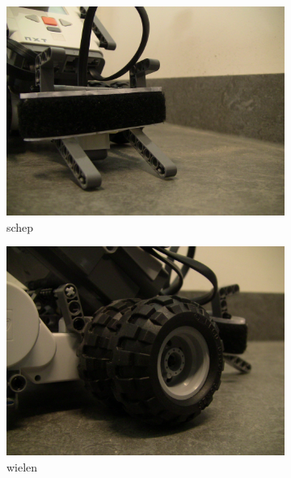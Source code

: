 \documentclass[tt2]{penoverslag}
\begin{document}
\begin{figure}
\centering
	\begin{subfigure}[h]{0.33\textwidth}
	\centering
		\includegraphics[width=\textwidth]{robotSchep}
		\caption{schep}
	\end{subfigure}%
	\begin{subfigure}[h]{0.33\textwidth}
		\centering
		\includegraphics[width=\textwidth]{robotWielen}
		\caption{wielen}
	\end{subfigure}%
	\begin{subfigure}[h]{0.33\textwidth}
		\centering

\end{subfigure}
\end{figure}
\end{document}

